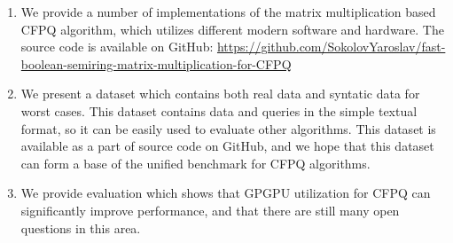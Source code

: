 \begin{enumerate}
\item We provide a number of implementations of the matrix multiplication based CFPQ algorithm, which utilizes different modern software and hardware.
The source code is available on GitHub: \href{https://github.com/SokolovYaroslav/fast-boolean-semiring-matrix-multiplication-for-CFPQ}{https://github.com/SokolovYaroslav/fast-boolean-semiring-matrix-multiplication-for-CFPQ}
\item We present a dataset which contains both real data and syntatic data for worst cases.
This dataset contains data and queries in the simple textual format, so it can be easily used to evaluate other algorithms.
This dataset is available as a part of source code on GitHub, and we hope that this dataset can form a base of the unified benchmark for CFPQ algorithms.
\item We provide evaluation which shows that GPGPU utilization for CFPQ can significantly improve performance, and that there are still many open questions in this area.
\end{enumerate}
